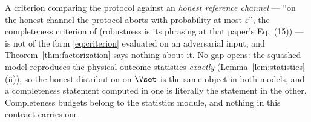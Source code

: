 
\begin{remark}
\label{rem:completeness}
A criterion comparing the protocol against an \emph{honest reference channel}
--- ``on the honest channel the protocol aborts with probability at most
$\varepsilon$'', the completeness criterion of
\cite[Eq.~(9)]{portmann2022security} (robustness is its phrasing at that
paper's Eq.~(15)) --- is not of the form
\eqref{eq:criterion} evaluated on an adversarial input, and
Theorem~\ref{thm:factorization} says nothing about it.
No gap opens: the squashed model reproduces the physical outcome statistics
\emph{exactly} (Lemma~\ref{lem:statistics}\,(ii)), so the honest distribution
on $\Vset$ is the same object in both models, and a completeness statement
computed in one is literally the statement in the other. Completeness budgets
belong to the statistics module, and nothing in this contract carries one.
\end{remark}
